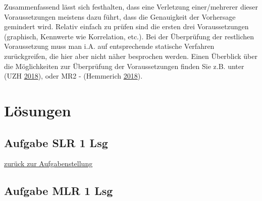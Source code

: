 \documentclass[]{article}
\begin{document}
Zusammenfassend lässt sich festhalten, dass eine Verletzung einer/mehrerer dieser Voraussetzungen meistens dazu führt, dass die Genauigkeit der Vorhersage gemindert wird. Relativ einfach zu prüfen sind die ersten drei Voraussetzungen (graphisch, Kennwerte wie Korrelation, etc.). Bei der Überprüfung der restlichen Voraussetzung muss man i.A. auf entsprechende statische Verfahren zurückgreifen, die hier aber nicht näher besprochen werden. Einen Überblick über die Möglichkeiten zur Überprüfung der Voraussetzungen finden Sie z.B. unter (UZH \protect\hyperlink{ref-UZH.2018}{2018}), oder MR2 - (Hemmerich \protect\hyperlink{ref-Hemmerich.2018}{2018}).

\hypertarget{losungen-1}{%
\section*{Lösungen}\label{losungen-1}}

\hypertarget{aufgabe-slr-1-lsg}{%
\subsection*{Aufgabe SLR 1 Lsg}\label{aufgabe-slr-1-lsg}}

\protect\hyperlink{aufgabe-slr-1}{zurück zur Aufgabenstellung}

\hypertarget{aufgabe-mlr-1-lsg}{%
\subsection*{Aufgabe MLR 1 Lsg}\label{aufgabe-mlr-1-lsg}}
\end{document}
